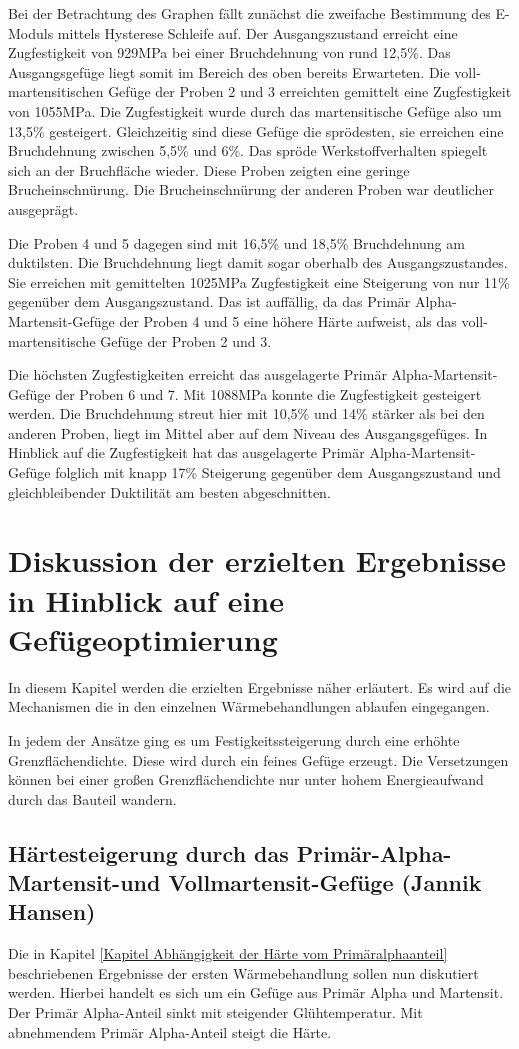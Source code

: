 \documentclass[a4paper, 11pt]{tubsreprt}
\begin{document}
Bei der Betrachtung des Graphen fällt zunächst die zweifache Bestimmung des E-Moduls mittels Hysterese Schleife auf.  Der Ausgangszustand erreicht eine Zugfestigkeit von 929MPa bei einer Bruchdehnung von rund 12,5\%. Das Ausgangsgefüge liegt somit im Bereich des oben bereits Erwarteten. Die voll-martensitischen Gefüge der Proben 2 und 3 erreichten gemittelt eine Zugfestigkeit von 1055MPa. Die Zugfestigkeit wurde durch das martensitische Gefüge also um 13,5\% gesteigert. Gleichzeitig sind diese Gefüge die sprödesten, sie erreichen eine Bruchdehnung zwischen 5,5\% und 6\%. Das spröde Werkstoffverhalten spiegelt sich an der Bruchfläche wieder. Diese Proben zeigten eine geringe Brucheinschnürung. Die Brucheinschnürung der anderen Proben war deutlicher ausgeprägt.

Die Proben 4 und 5 dagegen sind mit 16,5\% und 18,5\% Bruchdehnung am duktilsten. Die Bruchdehnung liegt damit sogar oberhalb des Ausgangszustandes. Sie erreichen mit gemittelten 1025MPa Zugfestigkeit eine Steigerung von nur 11\% gegenüber dem Ausgangszustand. Das ist auffällig, da das Primär Alpha-Martensit-Gefüge der Proben 4 und 5 eine höhere Härte aufweist, als das voll-martensitische Gefüge der Proben 2 und 3.

Die höchsten Zugfestigkeiten erreicht das ausgelagerte Primär Alpha-Martensit-Gefüge der Proben 6 und 7. Mit 1088MPa konnte die Zugfestigkeit gesteigert werden. Die Bruchdehnung streut hier mit 10,5\% und 14\% stärker als bei den anderen Proben, liegt im Mittel aber auf dem Niveau des Ausgangsgefüges. In Hinblick auf die Zugfestigkeit hat das ausgelagerte Primär Alpha-Martensit-Gefüge folglich mit knapp 17\% Steigerung gegenüber dem Ausgangszustand und gleichbleibender Duktilität am besten abgeschnitten. 

\chapter{Diskussion der erzielten Ergebnisse in Hinblick auf eine Gefügeoptimierung}
In diesem Kapitel werden die erzielten Ergebnisse näher erläutert. Es wird auf die Mechanismen die in den  einzelnen Wärmebehandlungen ablaufen eingegangen.

In jedem der Ansätze ging es um Festigkeitssteigerung durch eine erhöhte Grenzflächendichte. Diese wird durch ein feines Gefüge erzeugt. Die Versetzungen können bei einer großen Grenzflächendichte nur unter hohem Energieaufwand durch das Bauteil wandern. 
\section{Härtesteigerung durch das Primär-Alpha-Martensit-und Vollmartensit-Gefüge (Jannik Hansen)}\label{Kapitel einfluss des Primäralphaanteils}
Die in Kapitel \ref{Kapitel Abhängigkeit der Härte vom Primäralphaanteil} beschriebenen Ergebnisse der ersten Wärmebehandlung sollen nun diskutiert werden. Hierbei handelt es sich um ein Gefüge aus Primär Alpha und Martensit. Der Primär Alpha-Anteil sinkt mit steigender Glühtemperatur. Mit abnehmendem Primär Alpha-Anteil steigt die Härte.
\end{document}
